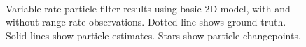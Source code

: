 \documentclass[conference]{IEEEtran}
\begin{document}
\begin{figure}[!t]
\centering
{}
\\
\caption{Variable rate particle filter results using basic 2D model, with and without range rate observations. Dotted line shows ground truth. Solid lines show particle estimates. Stars show particle changepoints.}
\label{fig:2D_Model1}
\end{figure}
%
\end{document}
